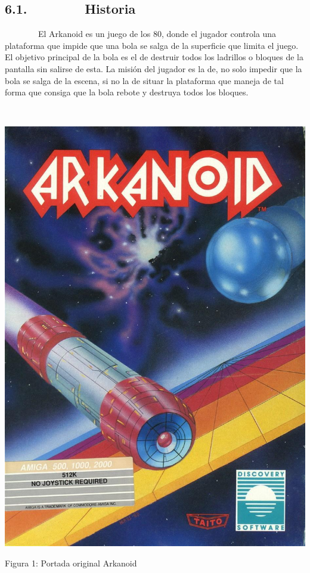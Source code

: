 \documentclass[]{article}
\begin{document}
\subsection{6.1.~~~~~~~~Historia}

~~~~~~~~El Arkanoid es un juego de los 80, donde el jugador controla una
plataforma que impide que una bola se salga de la superficie que limita
el juego. El objetivo principal de la bola es el de destruir todos los
ladrillos o bloques de la pantalla sin salirse de esta. La misión del
jugador es la de, no solo impedir que la bola se salga de la escena, si
no la de situar la plataforma que maneja de tal forma que consiga que la
bola rebote y destruya todos los bloques.

~~~~~~~~~~~~~~~~~ ~~~~~~~~~~~~~~~~~

\includegraphics{images/image15.jpg}

Figura 1: Portada original Arkanoid
\end{document}
